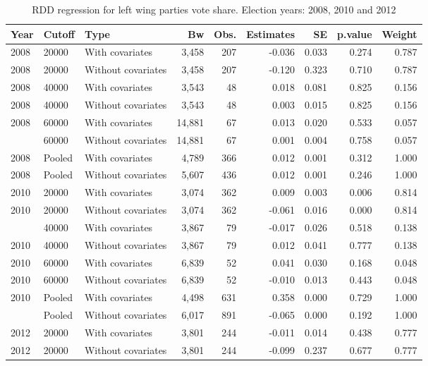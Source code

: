 \documentclass[12pt,]{article}
\begin{document}
\begin{table}[!h]

\caption{\label{tab:r.pct.vote}RDD regression for left wing parties vote share. Election years: 2008, 2010 and 2012}
\centering
\begin{tabular}{lllrrrrrr}
\toprule
Year & Cutoff & Type & Bw & Obs. & Estimates & SE & p.value & Weight\\
\midrule
2008 & 20000 & With covariates & 3,458 & 207 & -0.036 & 0.033 & 0.274 & 0.787\\
2008 & 20000 & Without covariates & 3,458 & 207 & -0.120 & 0.323 & 0.710 & 0.787\\
2008 & 40000 & With covariates & 3,543 & 48 & 0.018 & 0.081 & 0.825 & 0.156\\
2008 & 40000 & Without covariates & 3,543 & 48 & 0.003 & 0.015 & 0.825 & 0.156\\
2008 & 60000 & With covariates & 14,881 & 67 & 0.013 & 0.020 & 0.533 & 0.057\\
\addlinespace
2008 & 60000 & Without covariates & 14,881 & 67 & 0.001 & 0.004 & 0.758 & 0.057\\
2008 & Pooled & With covariates & 4,789 & 366 & 0.012 & 0.001 & 0.312 & 1.000\\
2008 & Pooled & Without covariates & 5,607 & 436 & 0.012 & 0.001 & 0.246 & 1.000\\
2010 & 20000 & With covariates & 3,074 & 362 & 0.009 & 0.003 & 0.006 & 0.814\\
2010 & 20000 & Without covariates & 3,074 & 362 & -0.061 & 0.016 & 0.000 & 0.814\\
\addlinespace
2010 & 40000 & With covariates & 3,867 & 79 & -0.017 & 0.026 & 0.518 & 0.138\\
2010 & 40000 & Without covariates & 3,867 & 79 & 0.012 & 0.041 & 0.777 & 0.138\\
2010 & 60000 & With covariates & 6,839 & 52 & 0.041 & 0.030 & 0.168 & 0.048\\
2010 & 60000 & Without covariates & 6,839 & 52 & -0.010 & 0.013 & 0.443 & 0.048\\
2010 & Pooled & With covariates & 4,498 & 631 & 0.358 & 0.000 & 0.729 & 1.000\\
\addlinespace
2010 & Pooled & Without covariates & 6,017 & 891 & -0.065 & 0.000 & 0.192 & 1.000\\
2012 & 20000 & With covariates & 3,801 & 244 & -0.011 & 0.014 & 0.438 & 0.777\\
2012 & 20000 & Without covariates & 3,801 & 244 & -0.099 & 0.237 & 0.677 & 0.777\\

\end{tabular}
\end{table}
\end{document}
